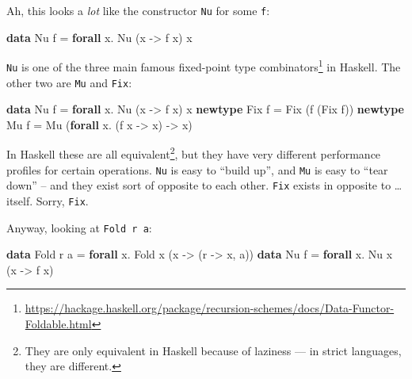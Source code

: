 \documentclass[]{article}
\newenvironment{Shaded}{}{}
\newcommand{\DataTypeTok}[1]{\textcolor[rgb]{0.56,0.13,0.00}{#1}}
\newcommand{\KeywordTok}[1]{\textcolor[rgb]{0.00,0.44,0.13}{\textbf{#1}}}
\newcommand{\NormalTok}[1]{#1}
\newcommand{\OperatorTok}[1]{\textcolor[rgb]{0.40,0.40,0.40}{#1}}
\newcommand{\OtherTok}[1]{\textcolor[rgb]{0.00,0.44,0.13}{#1}}
\renewcommand{\href}[2]{#2\footnote{\url{#1}}}
\begin{document}
Ah, this looks a \emph{lot} like the constructor \texttt{Nu} for some
\texttt{f}:

\begin{Shaded}
\begin{Highlighting}[]
\KeywordTok{data} \DataTypeTok{Nu}\NormalTok{ f }\OtherTok{=} \KeywordTok{forall}\NormalTok{ x}\OperatorTok{.} \DataTypeTok{Nu}\NormalTok{ (x }\OtherTok{{-}\textgreater{}}\NormalTok{ f x) x}
\end{Highlighting}
\end{Shaded}

\texttt{Nu} is one of the three main famous
\href{https://hackage.haskell.org/package/recursion-schemes/docs/Data-Functor-Foldable.html}{fixed-point
type combinators} in Haskell. The other two are \texttt{Mu} and \texttt{Fix}:

\begin{Shaded}
\begin{Highlighting}[]
\KeywordTok{data}    \DataTypeTok{Nu}\NormalTok{  f }\OtherTok{=} \KeywordTok{forall}\NormalTok{ x}\OperatorTok{.} \DataTypeTok{Nu}\NormalTok{ (x }\OtherTok{{-}\textgreater{}}\NormalTok{ f x) x}
\KeywordTok{newtype} \DataTypeTok{Fix}\NormalTok{ f }\OtherTok{=} \DataTypeTok{Fix}\NormalTok{ (f (}\DataTypeTok{Fix}\NormalTok{ f))}
\KeywordTok{newtype} \DataTypeTok{Mu}\NormalTok{  f }\OtherTok{=} \DataTypeTok{Mu}\NormalTok{ (}\KeywordTok{forall}\NormalTok{ x}\OperatorTok{.}\NormalTok{ (f x }\OtherTok{{-}\textgreater{}}\NormalTok{ x) }\OtherTok{{-}\textgreater{}}\NormalTok{ x)}
\end{Highlighting}
\end{Shaded}

In Haskell these are all equivalent\footnote{They are only equivalent in Haskell
  because of laziness --- in strict languages, they are different.}, but they
have very different performance profiles for certain operations. \texttt{Nu} is
easy to ``build up'', and \texttt{Mu} is easy to ``tear down'' -- and they exist
sort of opposite to each other. \texttt{Fix} exists in opposite to \ldots{}
itself. Sorry, \texttt{Fix}.

Anyway, looking at \texttt{Fold\ r\ a}:

\begin{Shaded}
\begin{Highlighting}[]
\KeywordTok{data} \DataTypeTok{Fold}\NormalTok{ r a }\OtherTok{=} \KeywordTok{forall}\NormalTok{ x}\OperatorTok{.} \DataTypeTok{Fold}\NormalTok{ x (x }\OtherTok{{-}\textgreater{}}\NormalTok{ (r }\OtherTok{{-}\textgreater{}}\NormalTok{ x, a))}
\KeywordTok{data} \DataTypeTok{Nu}\NormalTok{   f   }\OtherTok{=} \KeywordTok{forall}\NormalTok{ x}\OperatorTok{.} \DataTypeTok{Nu}\NormalTok{   x (x }\OtherTok{{-}\textgreater{}}\NormalTok{ f x)}
\end{Highlighting}
\end{Shaded}
\end{document}
